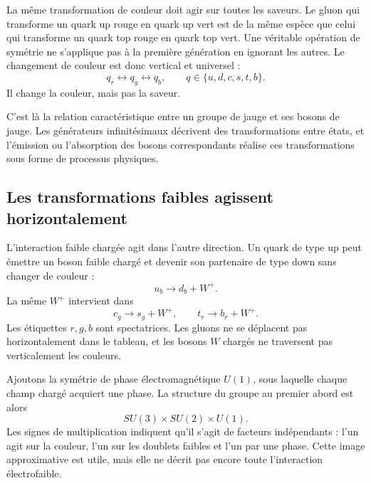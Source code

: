 La même transformation de couleur doit agir sur toutes les saveurs. Le gluon qui transforme un quark up rouge en quark up vert est de la même espèce que celui qui transforme un quark top rouge en quark top vert. Une véritable opération de symétrie ne s’applique pas à la première génération en ignorant les autres. Le changement de couleur est donc vertical et universel :
\begin{equation}
  q_r\longleftrightarrow q_g\longleftrightarrow q_b,
  \qquad q\in\{u,d,c,s,t,b\}.
\end{equation}
Il change la couleur, mais pas la saveur.

C’est là la relation caractéristique entre un groupe de jauge et ses bosons de jauge. Les générateurs infinitésimaux décrivent des transformations entre états, et l’émission ou l’absorption des bosons correspondants réalise ces transformations sous forme de processus physiques.

\subsection{Les transformations faibles agissent horizontalement}

L’interaction faible chargée agit dans l’autre direction. Un quark de type up peut émettre un boson faible chargé et devenir son partenaire de type down sans changer de couleur :
\begin{equation}
  u_b\longrightarrow d_b+W^+.
\end{equation}
La même \(W^+\) intervient dans
\begin{equation}
  c_g\longrightarrow s_g+W^+,
  \qquad
  t_r\longrightarrow b_r+W^+.
\end{equation}
Les étiquettes \(r,g,b\) sont spectatrices. Les gluons ne se déplacent pas horizontalement dans le tableau, et les bosons \(W\) chargés ne traversent pas verticalement les couleurs.

Ajoutons la symétrie de phase électromagnétique \(U(1)\), sous laquelle chaque champ chargé acquiert une phase. La structure du groupe au premier abord est alors
\begin{equation}
  SU(3)\times SU(2)\times U(1).
\end{equation}
Les signes de multiplication indiquent qu’il s’agit de facteurs indépendants : l’un agit sur la couleur, l’un sur les doublets faibles et l’un par une phase. Cette image approximative est utile, mais elle ne décrit pas encore toute l’interaction électrofaible.

